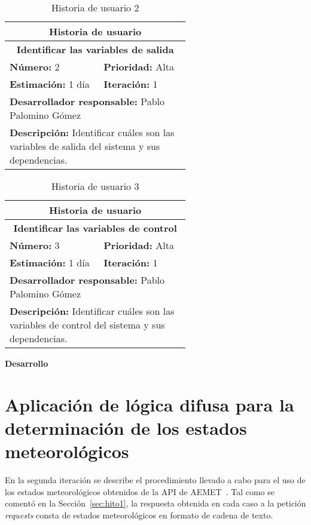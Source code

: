 \begin{table}[H]
        \centering
        \begin{tabular}{|p{0.3\linewidth}|p{0.3\linewidth}|}
          \hline
          \multicolumn{2}{|c|}{Historia de usuario}\\ \hline
          \multicolumn{2}{|c|}{\textbf{Identificar las variables de salida}}\\ \hline
          \textbf{Número:} 2 & \textbf{Prioridad:} Alta\\ \hline
          \textbf{Estimación:} 1 día & \textbf{Iteración:} 1\\ \hline
          \multicolumn{2}{|l|}{\textbf{Desarrollador responsable:} Pablo Palomino Gómez}\\ \hline
          \multicolumn{2}{|p{0.6\linewidth}|}{\textbf{Descripción:} Identificar cuáles son las variables de salida del sistema y sus dependencias.}\\ \hline
        \end{tabular}
        \caption{Historia de usuario 2}
        \label{tab:hist2}
\end{table}
\begin{table}[H]
        \centering
        \begin{tabular}{|p{0.3\linewidth}|p{0.3\linewidth}|}
          \hline
          \multicolumn{2}{|c|}{Historia de usuario}\\ \hline
          \multicolumn{2}{|c|}{\textbf{Identificar las variables de control}}\\ \hline
          \textbf{Número:} 3 & \textbf{Prioridad:} Alta\\ \hline
          \textbf{Estimación:} 1 día & \textbf{Iteración:} 1\\ \hline
          \multicolumn{2}{|l|}{\textbf{Desarrollador responsable:} Pablo Palomino Gómez}\\ \hline
          \multicolumn{2}{|p{0.6\linewidth}|}{\textbf{Descripción:} Identificar cuáles son las variables de control del sistema y sus dependencias.}\\ \hline
        \end{tabular}
        \caption{Historia de usuario 3}
        \label{tab:hist3}
\end{table}
\textbf{Desarrollo}\\


\section{Aplicación de lógica difusa para la determinación de los estados meteorológicos}
\label{sec:hito2}
En la segunda iteración se describe el procedimiento llevado a cabo para el uso de los estados meteorológicos obtenidos de la \gls{API} de \gls{AEMET}~\cite{Aemet}. Tal como se comentó en la Sección~\ref{sec:hito1}, la respuesta obtenida en cada caso a la petición \textit{requests} consta de estados meteorológicos en formato de cadena de texto.\\


